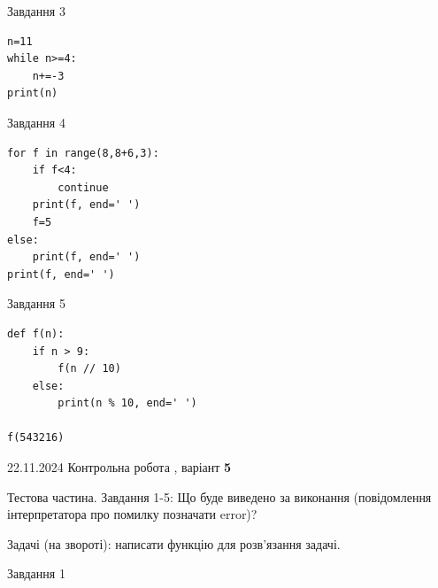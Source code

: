 \documentclass[12pt, ukrainian]{article}
\begin{document}
{{{{\begin{minipage}[t]{8.5cm}
{\begin{center}Завдання {3}\end{center}}
\vspace{-6mm}

\begin{verbatim}
n=11
while n>=4:
    n+=-3
print(n)
\end{verbatim}


\end{minipage}
\vline \hspace{6mm}
\begin{minipage}[t]{10.7cm}
               
{\begin{center}Завдання {4}\end{center}}
\vspace{-6mm}

\begin{verbatim}
for f in range(8,8+6,3):
    if f<4:
        continue
    print(f, end=' ')
    f=5
else:
    print(f, end=' ')
print(f, end=' ')
\end{verbatim}


\vspace{5mm}
               
{\begin{center}Завдання {5}\end{center}}
\vspace{-6mm}

\begin{verbatim}
def f(n):
    if n > 9:
        f(n // 10)
    else:
        print(n % 10, end=' ')

f(543216)
\end{verbatim}


\end{minipage}

\newpage

{{22.11.2024 Контрольна робота , варіант  \No \textbf { 5 }\par}}
{

Тестова частина. Завдання 1-5: Що буде виведено за виконання (повідомлення інтерпретатора про помилку позначати error)?

Задачі (на звороті): написати функцію для розв'язання задачі.

\vspace{5mm} \begin{minipage}[t]{8.5cm}
               
{\begin{center}Завдання {1}\end{center}}
\vspace{-6mm}


\end{minipage}}}}}}
\end{document}
